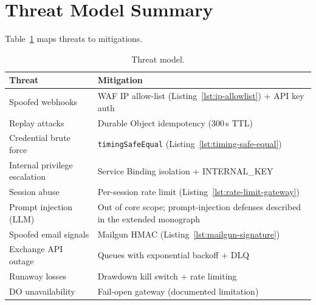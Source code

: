 \section{Threat Model Summary}
\label{app:threat}

Table~\ref{tab:threats} maps threats to mitigations.

\begin{table}[h]
  \centering
  \caption{Threat model.}
  \label{tab:threats}
  \small
  \begin{tabular*}{\linewidth}{@{\extracolsep{\fill}}lp{7cm}@{}}
    \toprule
    \textbf{Threat} & \textbf{Mitigation} \\
    \midrule
    Spoofed webhooks & WAF IP allow-list (Listing~\ref{lst:ip-allowlist}) + API key auth \\
    Replay attacks & Durable Object idempotency (300\,s TTL) \\
    Credential brute force & \texttt{timingSafeEqual} (Listing~\ref{lst:timing-safe-equal}) \\
    Internal privilege escalation & Service Binding isolation + INTERNAL\_KEY \\
    Session abuse & Per-session rate limit (Listing~\ref{lst:rate-limit-gateway}) \\
    Prompt injection (LLM) & Out of core scope; prompt-injection defenses described in the extended monograph \\
    Spoofed email signals & Mailgun HMAC (Listing~\ref{lst:mailgun-signature}) \\
    Exchange API outage & Queues with exponential backoff + DLQ \\
    Runaway losses & Drawdown kill switch + rate limiting \\
    DO unavailability & Fail-open gateway (documented limitation) \\
    \bottomrule
  \end{tabular*}
\end{table}
